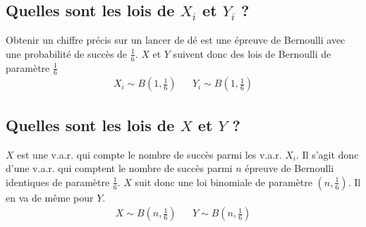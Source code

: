 \documentclass[10pt,a4paper,twoside]{article}
\begin{document}
\subsection{Quelles sont les lois de $X_{i}$ et $Y_{i}$ ?}
Obtenir un chiffre précis sur un lancer de dé est une épreuve de Bernoulli avec une probabilité de succès de $\frac{1}{6}$. $X$ et $Y$ suivent donc des lois de Bernoulli de paramètre $\frac{1}{6}$ 
\begin{align*}
X_{i} \sim B\left(1,\frac{1}{6}\right) && Y_{i} \sim B\left(1,\frac{1}{6}\right)
\end{align*}

\subsection{Quelles sont les lois de $X$ et $Y$ ?}
$X$ est une v.a.r. qui compte le nombre de succès parmi les v.a.r. $X_{i}$. Il s'agit donc d'une v.a.r. qui comptent le nombre de succès parmi $n$ épreuve de Bernoulli identiques de paramètre $\frac{1}{6}$. $X$ suit donc une loi binomiale de paramètre $(n,\frac{1}{6})$. Il en va de même pour $Y$.
\begin{align*}
X \sim B\left(n,\frac{1}{6}\right) && Y \sim B\left(n,\frac{1}{6}\right)
\end{align*}
\end{document}
